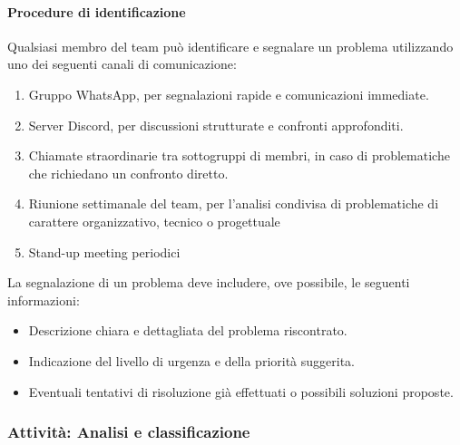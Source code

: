 \documentclass[a4paper,12pt]{article}
\begin{document}
\paragraph{Procedure di identificazione}
Qualsiasi membro del team può identificare e segnalare un problema utilizzando uno dei seguenti canali di comunicazione:
\begin{enumerate}
    \item Gruppo WhatsApp, per segnalazioni rapide e comunicazioni immediate.
    \item Server Discord, per discussioni strutturate e confronti approfonditi.
    \item Chiamate straordinarie tra sottogruppi di membri, in caso di problematiche che richiedano un confronto diretto.
    \item Riunione settimanale del team, per l'analisi condivisa di problematiche di carattere organizzativo, tecnico o progettuale
    \item Stand-up meeting periodici 
\end{enumerate}

La segnalazione di un problema deve includere, ove possibile, le seguenti informazioni:
\begin{itemize}
    \item Descrizione chiara e dettagliata del problema riscontrato.
    \item Indicazione del livello di urgenza e della priorità suggerita.
    \item Eventuali tentativi di risoluzione già effettuati o possibili soluzioni proposte.
\end{itemize}

\subsubsection{Attività: Analisi e classificazione}\label{analisi_classificazione}
\end{document}
